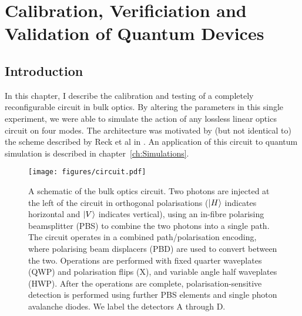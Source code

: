 \chapter{Calibration, Verificiation and Validation of Quantum Devices}
\label{ch:QCVV}

\section{Introduction}
\label{sec:QCVVIntro}
In this chapter, I describe the calibration and testing of a completely
reconfigurable circuit in bulk optics. By altering the parameters in this single
experiment, we were able to simulate the action of any lossless linear optics
circuit on four modes. The architecture was motivated by (but not identical to)
the scheme described by Reck et al in \cite{reck94}. An application of this
circuit to quantum simulation is described in chapter~\ref{ch:Simulations}.

\begin{figure}
  \centering
  \texttt{[image: figures/circuit.pdf]}
  \caption[A schematic of the bulk optics circuit used for simulations.]
  {A schematic of the bulk optics circuit. Two photons are injected at
  the left of the circuit in orthogonal polarisations (\(\left|H\right\rangle\) indicates
  horizontal and \(\left|V\right\rangle\) indicates vertical), using an in-fibre polarising
  beamsplitter (PBS) to combine the two photons into a single path. The circuit
  operates in a combined path/polarisation encoding, where polarising beam
  displacers (PBD) are used to convert between the two. Operations are performed
  with fixed quarter waveplates (QWP) and polarisation flips (X), and variable
  angle half waveplates (HWP). After the operations are complete,
  polarisation-sensitive detection is performed using further PBS elements and
  single photon avalanche diodes. We label the detectors A through D.}
  \label{fig:circuit}
\end{figure}

